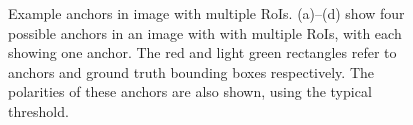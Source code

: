 \begin{figure}[!h]
    \caption[Example anchors in image with multiple RoIs]{Example anchors in image  with multiple RoIs. (a)--(d) show four possible anchors in an image with  with multiple RoIs, with each showing one anchor. The red and light green rectangles refer to anchors and ground truth bounding boxes respectively. The polarities of these anchors are also shown, using the typical threshold.}
	\label{fig:eganchor}
\end{figure}